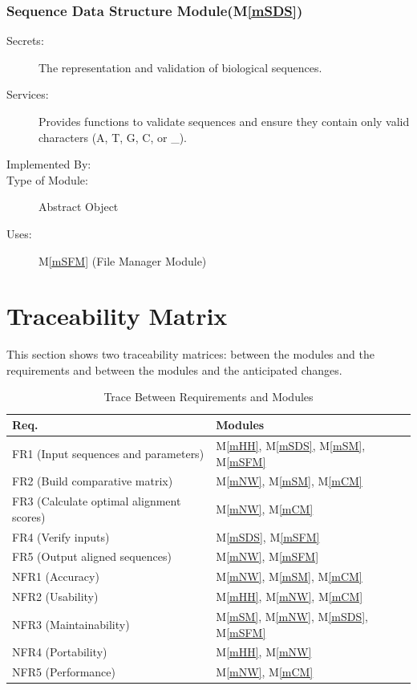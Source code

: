 \documentclass[12pt, titlepage]{article}
\newcommand{\mref}[1]{M\ref{#1}}
\begin{document}
\subsubsection{Sequence Data Structure Module(\mref{mSDS})}
\begin{description}
  \item[Secrets:] The representation and validation of biological sequences.
  \item[Services:] Provides functions to validate sequences and ensure they contain only valid characters (A, T, G, C, or \_).
  \item[Implemented By:] \progname{}
  \item[Type of Module:] Abstract Object
  \item[Uses:] \mref{mSFM} (File Manager Module)
\end{description}



\section{Traceability Matrix} \label{SecTM}

This section shows two traceability matrices: between the modules and the
requirements and between the modules and the anticipated changes.

\begin{table}[H]
  \centering
  \begin{tabular}{p{} p{}}
  \toprule
  \textbf{Req.} & \textbf{Modules}\\
  \midrule
  FR1 (Input sequences and parameters) & \mref{mHH}, \mref{mSDS}, \mref{mSM}, \mref{mSFM} \\
  FR2 (Build comparative matrix) & \mref{mNW}, \mref{mSM}, \mref{mCM} \\
  FR3 (Calculate optimal alignment scores) & \mref{mNW}, \mref{mCM} \\
  FR4 (Verify inputs) & \mref{mSDS}, \mref{mSFM} \\
  FR5 (Output aligned sequences) & \mref{mNW}, \mref{mSFM} \\
  NFR1 (Accuracy) & \mref{mNW}, \mref{mSM}, \mref{mCM} \\
  NFR2 (Usability) & \mref{mHH}, \mref{mNW}, \mref{mCM} \\
  NFR3 (Maintainability) & \mref{mSM}, \mref{mNW}, \mref{mSDS}, \mref{mSFM} \\
  NFR4 (Portability) & \mref{mHH}, \mref{mNW} \\
  NFR5 (Performance) & \mref{mNW}, \mref{mCM} \\
  \bottomrule
  \end{tabular}
  \caption{Trace Between Requirements and Modules}
  \label{TblRT}
\end{table}
\end{document}

